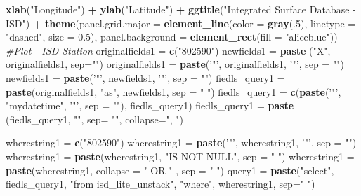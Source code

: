 \documentclass[12pt,oneside]{reedthesis}
\newenvironment{Shaded}{\begin{snugshade}}{\end{snugshade}}
\newcommand{\CommentTok}[1]{\textcolor[rgb]{0.56,0.35,0.01}{\textit{#1}}}
\newcommand{\DataTypeTok}[1]{\textcolor[rgb]{0.13,0.29,0.53}{#1}}
\newcommand{\DecValTok}[1]{\textcolor[rgb]{0.00,0.00,0.81}{#1}}
\newcommand{\FloatTok}[1]{\textcolor[rgb]{0.00,0.00,0.81}{#1}}
\newcommand{\KeywordTok}[1]{\textcolor[rgb]{0.13,0.29,0.53}{\textbf{#1}}}
\newcommand{\NormalTok}[1]{#1}
\newcommand{\OperatorTok}[1]{\textcolor[rgb]{0.81,0.36,0.00}{\textbf{#1}}}
\newcommand{\StringTok}[1]{\textcolor[rgb]{0.31,0.60,0.02}{#1}}
\begin{document}
\begin{Shaded}
\begin{Highlighting}[]
\StringTok{  }\KeywordTok{xlab}\NormalTok{(}\StringTok{"Longitude"}\NormalTok{) }\OperatorTok{+}\StringTok{ }
\StringTok{  }\KeywordTok{ylab}\NormalTok{(}\StringTok{"Latitude"}\NormalTok{) }\OperatorTok{+}\StringTok{ }
\StringTok{  }\KeywordTok{ggtitle}\NormalTok{(}\StringTok{"Integrated Surface Database - ISD"}\NormalTok{) }\OperatorTok{+}\StringTok{ }
\StringTok{  }\KeywordTok{theme}\NormalTok{(}\DataTypeTok{panel.grid.major =} \KeywordTok{element_line}\NormalTok{(}\DataTypeTok{color =} \KeywordTok{gray}\NormalTok{(.}\DecValTok{5}\NormalTok{), }\DataTypeTok{linetype =} \StringTok{"dashed"}\NormalTok{, }\DataTypeTok{size =} \FloatTok{0.5}\NormalTok{), }\DataTypeTok{panel.background =} \KeywordTok{element_rect}\NormalTok{(}\DataTypeTok{fill =} \StringTok{"aliceblue"}\NormalTok{))}
\CommentTok{#Plot - ISD Station}
\NormalTok{originalfields1 =}\StringTok{ }\KeywordTok{c}\NormalTok{(}\StringTok{"802590"}\NormalTok{)}
\NormalTok{newfields1 =}\StringTok{ }\KeywordTok{paste}\NormalTok{ (}\StringTok{"X"}\NormalTok{, originalfields1, }\DataTypeTok{sep=}\StringTok{""}\NormalTok{)}
\NormalTok{originalfields1 =}\StringTok{ }\KeywordTok{paste}\NormalTok{(}\StringTok{'"'}\NormalTok{, originalfields1, }\StringTok{'"'}\NormalTok{, }\DataTypeTok{sep =} \StringTok{""}\NormalTok{)}
\NormalTok{newfields1 =}\StringTok{ }\KeywordTok{paste}\NormalTok{(}\StringTok{'"'}\NormalTok{, newfields1, }\StringTok{'"'}\NormalTok{, }\DataTypeTok{sep =} \StringTok{""}\NormalTok{)}
\NormalTok{fiedls_query1 =}\StringTok{ }\KeywordTok{paste}\NormalTok{(originalfields1, }\StringTok{"as"}\NormalTok{, newfields1, }\DataTypeTok{sep =} \StringTok{" "}\NormalTok{)}
\NormalTok{fiedls_query1 =}\StringTok{ }\KeywordTok{c}\NormalTok{(}\KeywordTok{paste}\NormalTok{(}\StringTok{'"'}\NormalTok{, }\StringTok{"mydatetime"}\NormalTok{, }\StringTok{'"'}\NormalTok{, }\DataTypeTok{sep =} \StringTok{""}\NormalTok{), fiedls_query1)}
\NormalTok{fiedls_query1 =}\StringTok{ }\KeywordTok{paste}\NormalTok{ (fiedls_query1, }\StringTok{""}\NormalTok{, }\DataTypeTok{sep=} \StringTok{""}\NormalTok{, }\DataTypeTok{collapse=}\StringTok{", "}\NormalTok{)}

\NormalTok{wherestring1 =}\StringTok{ }\KeywordTok{c}\NormalTok{(}\StringTok{"802590"}\NormalTok{)}
\NormalTok{wherestring1 =}\StringTok{ }\KeywordTok{paste}\NormalTok{(}\StringTok{'"'}\NormalTok{, wherestring1, }\StringTok{'"'}\NormalTok{, }\DataTypeTok{sep =} \StringTok{""}\NormalTok{)}
\NormalTok{wherestring1 =}\StringTok{ }\KeywordTok{paste}\NormalTok{(wherestring1, }\StringTok{"IS NOT NULL"}\NormalTok{, }\DataTypeTok{sep =} \StringTok{" "}\NormalTok{)}
\NormalTok{wherestring1 =}\StringTok{ }\KeywordTok{paste}\NormalTok{(wherestring1, }\DataTypeTok{collapse =} \StringTok{" OR "}\NormalTok{ , }\DataTypeTok{sep =} \StringTok{" "}\NormalTok{)}
\NormalTok{query1 =}\StringTok{ }\KeywordTok{paste}\NormalTok{(}\StringTok{"select"}\NormalTok{, fiedls_query1, }\StringTok{"from isd_lite_unstack"}\NormalTok{, }\StringTok{"where"}\NormalTok{, wherestring1, }\DataTypeTok{sep=}\StringTok{" "}\NormalTok{)}


\end{Highlighting}
\end{Shaded}
\end{document}
